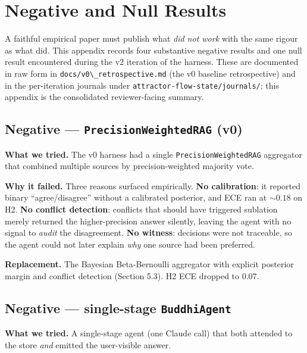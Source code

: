 \section{Negative and Null Results}\label{negative-and-null-results}

A faithful empirical paper must publish what \emph{did not work} with the same rigour as what did. This appendix records four substantive negative results and one null result encountered during the v2 iteration of the harness. These are documented in raw form in \passthrough{\lstinline!docs/v0\_retrospective.md!} (the v0 baseline retrospective) and in the per-iteration journals under \passthrough{\lstinline!attractor-flow-state/journals/!}; this appendix is the consolidated reviewer-facing summary.

\subsection{\texorpdfstring{Negative --- \texttt{PrecisionWeightedRAG} (v0)}{Negative --- PrecisionWeightedRAG (v0)}}\label{negative-precisionweightedrag-v0}

\textbf{What we tried.} The v0 harness had a single \passthrough{\lstinline!PrecisionWeightedRAG!} aggregator that combined multiple sources by precision-weighted majority vote.

\textbf{Why it failed.} Three reasons surfaced empirically. \textbf{No calibration}: it reported binary ``agree/disagree'' without a calibrated posterior, and ECE ran at \(\sim 0.18\) on H2. \textbf{No conflict detection}: conflicts that should have triggered sublation merely returned the higher-precision answer silently, leaving the agent with no signal to \emph{audit} the disagreement. \textbf{No witness}: decisions were not traceable, so the agent could not later explain \emph{why} one source had been preferred.

\textbf{Replacement.} The Bayesian Beta-Bernoulli aggregator with explicit posterior margin and conflict detection (Section 5.3). H2 ECE dropped to \(0.07\).

\subsection{\texorpdfstring{Negative --- single-stage \texttt{BuddhiAgent}}{Negative --- single-stage BuddhiAgent}}\label{negative-single-stage-buddhiagent}

\textbf{What we tried.} A single-stage agent (one Claude call) that both attended to the store \emph{and} emitted the user-visible answer.

